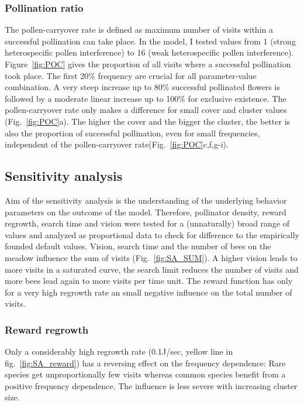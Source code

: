 \subsubsection*{Pollination ratio}
The pollen-carryover rate is defined as maximum number of visits within a successful pollination can take place. In the model, I tested values from 1 (strong heterospecific pollen interference) to 16 (weak heterospecific pollen interference). Figure~\ref{fig:POC} gives the proportion of all visits where a successful pollination took place. The first 20\% frequency are crucial for all parameter-value combination. A very steep increase up to 80\% successful pollinated flowers is followed by a moderate linear increase up to 100\% for exclusive existence. The pollen-carryover rate only makes a difference for small cover and cluster values (Fig.~\ref{fig:POC}a). The higher the cover and the bigger the cluster, the better is also the proportion of successful pollination, even for small frequencies, independent of the pollen-carryover rate(Fig.~\ref{fig:POC}c,f,g-i). 

\subsection*{Sensitivity analysis}
Aim of the sensitivity analysis is the understanding of the underlying behavior parameters on the outcome of the model. Therefore, pollinator density, reward regrowth, search time and vision were tested for a (unnaturally) broad range of values and analyzed as proportional data to check for difference to the empirically founded default values. Vision, search time and the number of bees on the meadow influence the sum of visits (Fig.~\ref{fig:SA_SUM}). A higher vision leads to more visits in a saturated curve, the search limit reduces the number of visits and more bees lead again to more visits per time unit. The reward function has only for a very high regrowth rate an small negative influence on the total number of visits.

\subsubsection*{Reward regrowth}
Only a considerably high regrowth rate (0.1J/sec, yellow line in fig.~\ref{fig:SA_reward}) has a reversing effect on the frequency dependence: Rare species get unproportionally few visits whereas common species benefit from a positive frequency dependence. The influence is less severe with increasing cluster size. 

